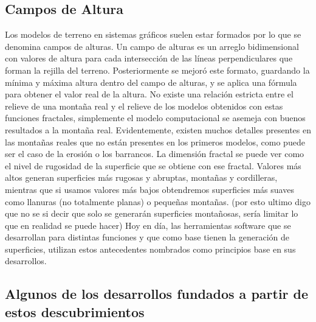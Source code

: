 \documentclass[12pt]{article} %
\begin{document}

\subsection{Campos de Altura} %

Los modelos de terreno en sistemas gráficos suelen estar formados por lo que se denomina campos de alturas. Un campo de alturas es un arreglo bidimensional con valores de altura para cada intersección de las líneas perpendiculares que forman la rejilla del terreno.
Posteriormente se mejoró este formato, guardando la mínima y máxima altura dentro del campo de alturas, y se aplica una fórmula para obtener el valor real de la altura.
No existe una relación estricta entre el relieve de una montaña real y el relieve de los modelos obtenidos con estas funciones fractales, simplemente el modelo computacional se asemeja con buenos resultados a la montaña real. Evidentemente, existen muchos detalles presentes en las montañas reales que no están presentes en los primeros modelos, como puede ser el caso de la erosión o los barrancos.
La dimensión fractal se puede ver como el nivel de rugosidad de la superficie que se obtiene con ese fractal. Valores más altos generan superficies más rugosas y abruptas, montañas y cordilleras, mientras que si usamos valores más bajos obtendremos superficies más suaves como llanuras (no totalmente planas) o pequeñas montañas. (por esto ultimo digo que no se si decir que solo se generarán superficies montañosas, sería limitar lo que en realidad se puede hacer)
Hoy en día, las herramientas software que se desarrollan para distintas funciones y que como base tienen la generación de superficies, utilizan estos antecedentes nombrados como principios base en sus desarrollos.



\subsection{Algunos de los desarrollos fundados a partir de estos descubrimientos} %
\end{document}
